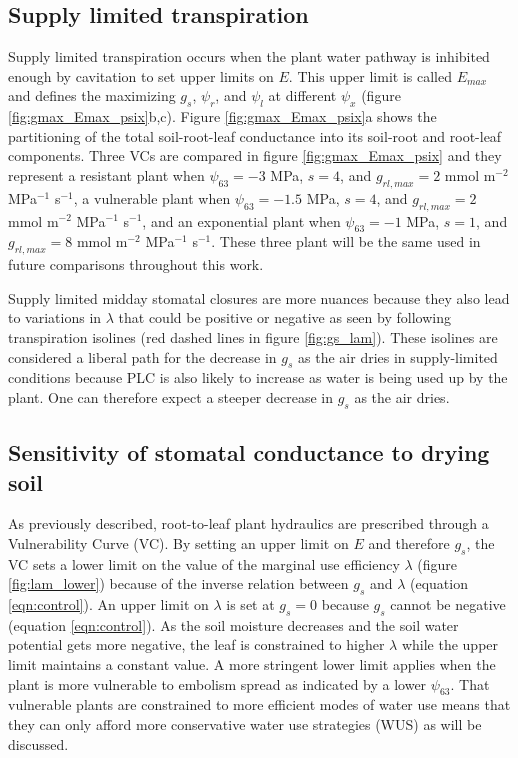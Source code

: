 \documentclass[utf8]{frontiersSCNS} %
\begin{document}
\subsection{Supply limited transpiration}

Supply limited transpiration occurs when the plant water pathway is inhibited enough by cavitation to set upper limits on $E$. This upper limit is called $E_{max}$ and defines the maximizing $g_s$, $\psi_r$, and $\psi_l$ at different $\psi_x$ (figure \ref{fig:gmax_Emax_psix}b,c). Figure \ref{fig:gmax_Emax_psix}a shows the partitioning of the total soil-root-leaf conductance into its soil-root and root-leaf components. Three VCs are compared in figure \ref{fig:gmax_Emax_psix} and they represent a resistant plant when $\psi_{63} = -3$ MPa, $s=4$, and $g_{rl,max} = 2$ mmol m$^{-2}$ MPa$^{-1}$ s$^{-1}$, a vulnerable plant when $\psi_{63} = -1.5$ MPa, $s=4$, and $g_{rl,max} = 2$ mmol m$^{-2}$ MPa$^{-1}$ s$^{-1}$, and an exponential plant when $\psi_{63} = -1$ MPa, $s=1$, and $g_{rl,max} = 8$ mmol m$^{-2}$ MPa$^{-1}$ s$^{-1}$. These three plant will be the same used in future comparisons throughout this work.



Supply limited midday stomatal closures are more nuances because they also lead to variations in $\lambda$ that could be positive or negative as seen by following transpiration isolines (red dashed lines in figure \ref{fig:gs_lam}). These isolines are considered a liberal path for the decrease in $g_s$ as the air dries in supply-limited conditions because PLC is also likely to increase as water is being used up by the plant. One can therefore expect a steeper decrease in $g_s$ as the air dries.

\subsection{Sensitivity of stomatal conductance to drying soil}

As previously described, root-to-leaf plant hydraulics are prescribed through a Vulnerability Curve (VC). By setting an upper limit on $E$ and therefore $g_s$, the VC sets a lower limit on the value of the marginal use efficiency $\lambda$ (figure \ref{fig:lam_lower}) because of the inverse relation between $g_s$ and $\lambda$ (equation \ref{eqn:control}). An upper limit on $\lambda$ is set at $g_s=0$ because $g_s$ cannot be negative (equation \ref{eqn:control}). As the soil moisture decreases and the soil water potential gets more negative, the leaf is constrained to higher $\lambda$ while the upper limit maintains a constant value. A more stringent lower limit applies when the plant is more vulnerable to embolism spread as indicated by a lower $\psi_{63}$. That vulnerable plants are constrained to more efficient modes of water use means that they can only afford more conservative water use strategies (WUS) as will be discussed.
\end{document}
